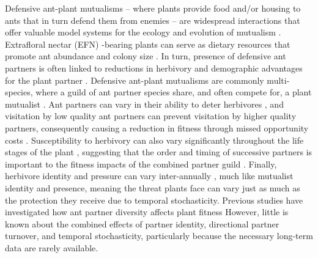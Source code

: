 \documentclass[11pt]{article}
\begin{document}
Defensive ant-plant mutualisms -- where plants provide food and/or housing to ants that in turn defend them from enemies -- are widespread interactions that offer valuable model systems for the ecology and evolution of mutualism \citep{Bronstein1998, Bronstein2006}. 
Extrafloral nectar (EFN) -bearing plants can serve as dietary resources that promote ant abundance and colony size \citep{Byk2011, Ness2009, Ness2006, Donald2022}.
In turn, presence of defensive ant partners is often linked to reductions in herbivory  \citep{Trager2010, Rudgers2004} and demographic advantages for the plant partner \citep{Baez2016}.
Defensive ant-plant mutualisms are commonly multi-species, where a guild of ant partner species share, and often compete for, a plant mutualist \citep{Bronstein1998, Beattie1985, Trager2010, Agrawal1998}.
Ant partners can vary in their ability to deter herbivores \citep{Bruna2014}, and visitation by low quality ant partners can prevent visitation by higher quality partners, consequently causing a reduction in fitness through missed opportunity costs \citep{Fraser2001, Frederickson2005}.
Susceptibility to herbivory can also vary significantly throughout the life stages of the plant \citep{Boege2005}, suggesting that the order and timing of successive partners is important to the fitness impacts of the combined partner guild \citep{Barton2010, Boege2005, Fonseca2003}.
Finally, herbivore identity and pressure can vary inter-annually \cite{Wetzel2023}, much like mutualist identity and presence, meaning the threat plants face can vary just as much as the protection they receive due to temporal stochasticity. 
Previous studies have investigated how ant partner diversity affects plant fitness \citep{Palmer2010,Afkhami2014,Fiala1994,Gaume1998,Dattilo2014,Ludka2015}
However, little is known about the combined effects of partner identity, directional partner turnover, and temporal stochasticity, particularly because the necessary long-term data are rarely available. 
	
\end{document}

